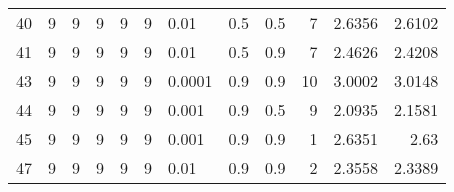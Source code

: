 \begin{longtable}{lrrrrrlrrrrr}
   40 &       9 & 9 & 9 & 9 & 9 &          0.01 &      0.5 &    0.5 &       7 &     2.6356 &        2.6102 \\
   41 &       9 & 9 & 9 & 9 & 9 &          0.01 &      0.5 &    0.9 &       7 &     2.4626 &        2.4208 \\
   43 &       9 & 9 & 9 & 9 & 9 &        0.0001 &      0.9 &    0.9 &      10 &     3.0002 &        3.0148 \\
   44 &       9 & 9 & 9 & 9 & 9 &         0.001 &      0.9 &    0.5 &       9 &     2.0935 &        2.1581 \\
   45 &       9 & 9 & 9 & 9 & 9 &         0.001 &      0.9 &    0.9 &       1 &     2.6351 &          2.63 \\
   47 &       9 & 9 & 9 & 9 & 9 &          0.01 &      0.9 &    0.9 &       2 &     2.3558 &        2.3389 \\
\end{longtable}
